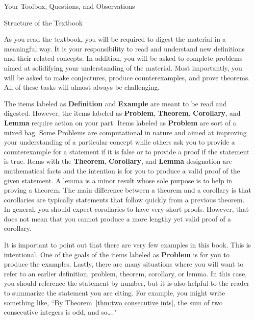 \begin{section}{Your Toolbox, Questions, and Observations}
\end{section}

\begin{section}{Structure of the Textbook}

As you read the textbook, you will be required to digest the material in a meaningful way.  It is your responsibility to read and understand new definitions and their related concepts.  
In addition, you will be asked to complete problems aimed at solidifying your understanding of the material.  Most importantly, you will be asked to make conjectures, produce counterexamples, and prove theorems. All of these tasks will almost always be challenging.

The items labeled as \textbf{Definition} and \textbf{Example} are meant to be read and digested.  However, the items labeled as \textbf{Problem}, \textbf{Theorem}, \textbf{Corollary}, and \textbf{Lemma} require action on your part.  Items labeled as \textbf{Problem} are sort of a mixed bag. Some Problems are computational in nature and aimed at improving your understanding of a particular concept while others ask you to provide a counterexample for a statement if it is false or to provide a proof if the statement is true. Items with the \textbf{Theorem}, \textbf{Corollary}, and \textbf{Lemma} designation are mathematical facts and the intention is for you to produce a valid proof of the given statement.  A lemma is a minor result whose sole purpose is to help in proving a theorem. The main difference between a theorem and a corollary is that corollaries are typically statements that follow quickly from a previous theorem.  In general, you should expect corollaries to have very short proofs.  However, that does not mean that you cannot produce a more lengthy yet valid proof of a corollary.

It is important to point out that there are very few examples in this book.  This is intentional.  One of the goals of the items labeled as \textbf{Problem} is for you to produce the examples. Lastly, there are many situations where you will want to refer to an earlier definition, problem, theorem, corollary, or lemma.  In this case, you should reference the statement by number, but it is also helpful to the reader to summarize the statement you are citing.  For example, you might write something like, ``By Theorem~\ref{thm:two consecutive ints}, the sum of two consecutive integers is odd, and so\ldots."

\end{section}

